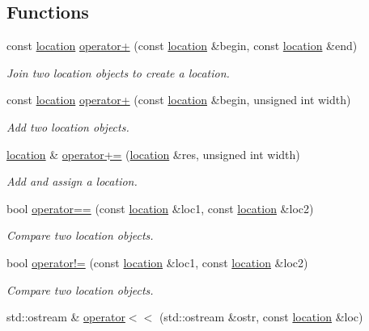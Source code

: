 \subsection*{Functions}
\begin{DoxyCompactItemize}
\item 
const \hyperlink{classyy_1_1location}{location} \hyperlink{namespaceyy_a2d68df6e5746b9aca23e7445c7a558a8}{operator+} (const \hyperlink{classyy_1_1location}{location} \&begin, const \hyperlink{classyy_1_1location}{location} \&end)
\begin{DoxyCompactList}\small\item\em Join two location objects to create a location. \end{DoxyCompactList}\item 
const \hyperlink{classyy_1_1location}{location} \hyperlink{namespaceyy_a09401c271b0db8cdd3b70df37b5ac660}{operator+} (const \hyperlink{classyy_1_1location}{location} \&begin, unsigned int width)
\begin{DoxyCompactList}\small\item\em Add two location objects. \end{DoxyCompactList}\item 
\hyperlink{classyy_1_1location}{location} \& \hyperlink{namespaceyy_a9c677252f514775b4ac6522044b1971b}{operator+=} (\hyperlink{classyy_1_1location}{location} \&res, unsigned int width)
\begin{DoxyCompactList}\small\item\em Add and assign a location. \end{DoxyCompactList}\item 
bool \hyperlink{namespaceyy_a466b6e3dcf6a743bb058bf4989b38047}{operator==} (const \hyperlink{classyy_1_1location}{location} \&loc1, const \hyperlink{classyy_1_1location}{location} \&loc2)
\begin{DoxyCompactList}\small\item\em Compare two location objects. \end{DoxyCompactList}\item 
bool \hyperlink{namespaceyy_aa3a5c205bc084696bb894634ae9cce80}{operator!=} (const \hyperlink{classyy_1_1location}{location} \&loc1, const \hyperlink{classyy_1_1location}{location} \&loc2)
\begin{DoxyCompactList}\small\item\em Compare two location objects. \end{DoxyCompactList}\item 
std::ostream \& \hyperlink{namespaceyy_a0cf2eadbbdd9836330989250647ee264}{operator$<$$<$} (std::ostream \&ostr, const \hyperlink{classyy_1_1location}{location} \&loc)

\end{DoxyCompactItemize}

